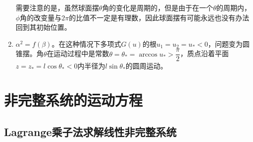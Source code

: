 \begin{example}[球面摆的运动]
\begin{enumerate}
需要注意的是，虽然球面摆$\theta$角的变化是周期的，但是由于在一个$\theta$的周期内，$\phi$角的改变量与$2\pi$的比值不一定是有理数，因此球面摆有可能永远也没有办法回到其初始位置。

\item $\alpha^2=f(\beta)$。在这种情况下多项式$G(u)$的根$u_1=u_2=u_*<0$，问题变为圆锥摆。角$\theta$在运动过程中是常数$\theta=\theta_*=\arccos u_*>\dfrac{\pi}{2}$，质点沿着平面$z=z_*=l\cos\theta_*<0$内半径为$l\sin\theta_*$的圆周运动。
\end{enumerate}
\end{example}

\section{非完整系统的运动方程}

\subsection{Lagrange乘子法求解线性非完整系统}

